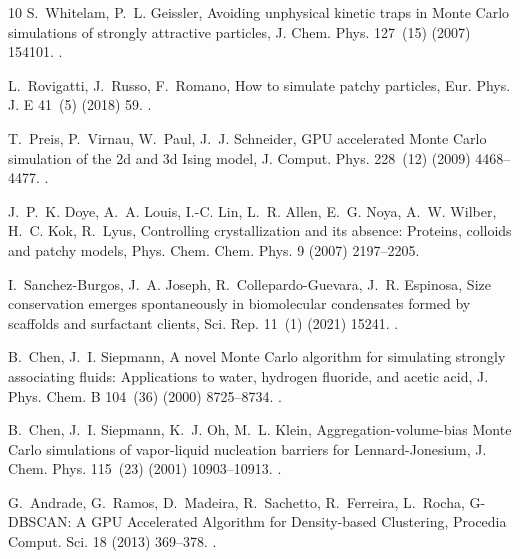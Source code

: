 \documentclass[final,5p,times,twocolumn]{elsarticle}
\begin{document}
\begin{thebibliography}{10}
S.~Whitelam, P.~L. Geissler, Avoiding unphysical kinetic traps in {Monte Carlo}
  simulations of strongly attractive particles, J. Chem. Phys. 127~(15) (2007)
  154101.
\newblock \href {https://doi.org/10.1063/1.2790421}
  {}.

L.~Rovigatti, J.~Russo, F.~Romano, How to simulate patchy particles, Eur. Phys.
  J. E 41~(5) (2018) 59.
\newblock \href {https://doi.org/10.1140/epje/i2018-11667-x}
  {}.

T.~Preis, P.~Virnau, W.~Paul, J.~J. Schneider, {GPU} accelerated {Monte Carlo}
  simulation of the 2d and 3d {Ising} model, J. Comput. Phys. 228~(12) (2009)
  4468--4477.
\newblock \href {https://doi.org/10.1016/j.jcp.2009.03.018}
  {}.

J.~P.~K. Doye, A.~A. Louis, I.-C. Lin, L.~R. Allen, E.~G. Noya, A.~W. Wilber,
  H.~C. Kok, R.~Lyus, Controlling crystallization and its absence: Proteins,
  colloids and patchy models, Phys. Chem. Chem. Phys. 9 (2007) 2197--2205.

I.~Sanchez-Burgos, J.~A. Joseph, R.~Collepardo-Guevara, J.~R. Espinosa, Size
  conservation emerges spontaneously in biomolecular condensates formed by
  scaffolds and surfactant clients, Sci. Rep. 11~(1) (2021) 15241.
\newblock \href {https://doi.org/10.1038/s41598-021-94309-y}
  {}.

B.~Chen, J.~I. Siepmann, A novel {Monte Carlo} algorithm for simulating
  strongly associating fluids: Applications to water, hydrogen fluoride, and
  acetic acid, J. Phys. Chem. B 104~(36) (2000) 8725--8734.
\newblock \href {https://doi.org/10.1021/jp001952u}
  {}.

B.~Chen, J.~I. Siepmann, K.~J. Oh, M.~L. Klein, Aggregation-volume-bias {Monte
  Carlo} simulations of vapor-liquid nucleation barriers for
  {Lennard-Jonesium}, J. Chem. Phys. 115~(23) (2001) 10903--10913.
\newblock \href {https://doi.org/10.1063/1.1417536}
  {}.

G.~Andrade, G.~Ramos, D.~Madeira, R.~Sachetto, R.~Ferreira, L.~Rocha,
  {G-DBSCAN: A GPU Accelerated Algorithm for Density-based Clustering},
  Procedia Comput. Sci. 18 (2013) 369--378.
\newblock \href {https://doi.org/10.1016/j.procs.2013.05.200}
  {}.


\end{thebibliography}
\end{document}
